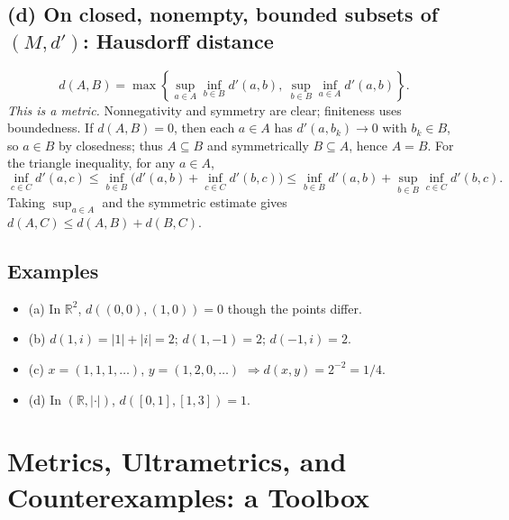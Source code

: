 \documentclass[12pt,a4paper]{article}
\begin{document}
\subsection*{(d) On closed, nonempty, bounded subsets of $(M,d')$: Hausdorff distance}
\[
d(A,B)=\max\!\left\{\sup_{a\in A}\inf_{b\in B} d'(a,b),\ \sup_{b\in B}\inf_{a\in A} d'(a,b)\right\}.
\]
\emph{This is a metric.} Nonnegativity and symmetry are clear; finiteness uses boundedness.
If $d(A,B)=0$, then each $a\in A$ has $d'(a,b_k)\to0$ with $b_k\in B$, so $a\in B$ by closedness; thus $A\subseteq B$ and symmetrically $B\subseteq A$, hence $A=B$.
For the triangle inequality, for any $a\in A$,
\[
\inf_{c\in C} d'(a,c)\le \inf_{b\in B}\!\big(d'(a,b)+\inf_{c\in C} d'(b,c)\big)
\le \inf_{b\in B} d'(a,b)+\sup_{b\in B}\inf_{c\in C} d'(b,c).
\]
Taking $\sup_{a\in A}$ and the symmetric estimate gives $d(A,C)\le d(A,B)+d(B,C)$.

\subsection*{Examples}
\begin{itemize}
\item (a) In $\mathbb{R}^2$, $d((0,0),(1,0))=0$ though the points differ.
\item (b) $d(1,i)=|1|+|i|=2$; $d(1,-1)=2$; $d(-1,i)=2$.
\item (c) $x=(1,1,1,\dots)$, $y=(1,2,0,\dots)$ $\Rightarrow d(x,y)=2^{-2}=1/4$.
\item (d) In $(\mathbb{R},|\cdot|)$, $d([0,1],[1,3])=1$.
\end{itemize}

\section*{Metrics, Ultrametrics, and Counterexamples: a Toolbox}
\end{document}
